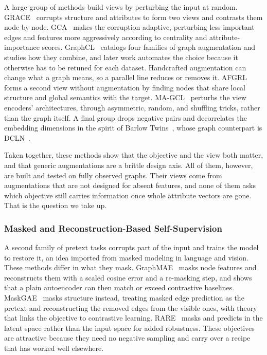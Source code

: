 A large group of methods build views by perturbing the input at random. GRACE~\cite{zhu2020grace} corrupts
structure and attributes to form two views and contrasts them node by node. GCA~\cite{zhu2021gca} makes
the corruption adaptive, perturbing less important edges and features more aggressively
according to centrality and attribute-importance scores. GraphCL~\cite{you2020graphcl} catalogs four families
of graph augmentation and studies how they combine, and later work automates the choice
because it otherwise has to be retuned for each dataset. Handcrafted augmentation can change
what a graph means, so a parallel line reduces or removes it. AFGRL~\cite{lee2022afgrl} forms a second view
without augmentation by finding nodes that share local structure and global semantics with
the target. MA-GCL~\cite{gong2023magcl} perturbs the view encoders' architectures, through asymmetric,
random, and shuffling tricks, rather than the graph itself. A final group drops negative
pairs and decorrelates the embedding dimensions in the spirit of Barlow Twins~\cite{zbontar2021barlow}, whose
graph counterpart is DCLN~\cite{peng2023dcln}.

Taken together, these methods show that the objective and the view both matter, and that
generic augmentations are a brittle design axis. All of them, however, are built and tested
on fully observed graphs. Their views come from augmentations that are not designed for
absent features, and none of them asks which objective still carries information once whole
attribute vectors are gone. That is the question we take up.

\subsubsection{Masked and Reconstruction-Based Self-Supervision}
\label{sec:related-masked}

A second family of pretext tasks corrupts part of the input and trains the model to restore
it, an idea imported from masked modeling in language and vision. These methods differ in
what they mask. GraphMAE~\cite{hou2022graphmae} masks node features and reconstructs them with a scaled cosine
error and a re-masking step, and shows that a plain autoencoder can then match or exceed
contrastive baselines. MaskGAE~\cite{li2023maskgae} masks structure instead, treating masked edge prediction
as the pretext and reconstructing the removed edges from the visible ones, with theory that
links the objective to contrastive learning. RARE~\cite{tu2023rare} masks and predicts in the latent
space rather than the input space for added robustness. These objectives are attractive
because they need no negative sampling and carry over a recipe that has worked well
elsewhere.

